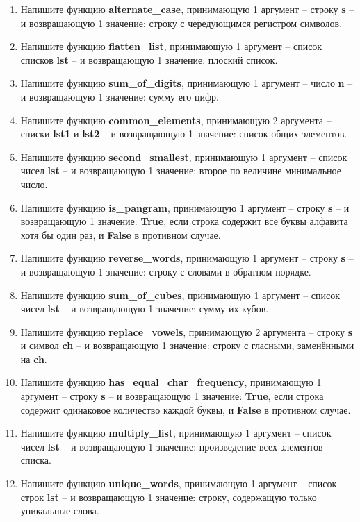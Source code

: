 \documentclass[a4,12pt]{article}
\theoremstyle{remark}
\begin{document}
\begin{enumerate}
    \item Напишите функцию \textbf{alternate\_case}, принимающую 1 аргумент – строку \textbf{s} – и возвращающую 1 значение: строку с чередующимся регистром символов.
    \item Напишите функцию \textbf{flatten\_list}, принимающую 1 аргумент – список списков \textbf{lst} – и возвращающую 1 значение: плоский список.
    \item Напишите функцию \textbf{sum\_of\_digits}, принимающую 1 аргумент – число \textbf{n} – и возвращающую 1 значение: сумму его цифр.
    \item Напишите функцию \textbf{common\_elements}, принимающую 2 аргумента – списки \textbf{lst1} и \textbf{lst2} – и возвращающую 1 значение: список общих элементов.
    \item Напишите функцию \textbf{second\_smallest}, принимающую 1 аргумент – список чисел \textbf{lst} – и возвращающую 1 значение: второе по величине минимальное число.
    \item Напишите функцию \textbf{is\_pangram}, принимающую 1 аргумент – строку \textbf{s} – и возвращающую 1 значение: \textbf{True}, если строка содержит все буквы алфавита хотя бы один раз, и \textbf{False} в противном случае.
    \item Напишите функцию \textbf{reverse\_words}, принимающую 1 аргумент – строку \textbf{s} – и возвращающую 1 значение: строку с словами в обратном порядке.
    \item Напишите функцию \textbf{sum\_of\_cubes}, принимающую 1 аргумент – список чисел \textbf{lst} – и возвращающую 1 значение: сумму их кубов.
    \item Напишите функцию \textbf{replace\_vowels}, принимающую 2 аргумента – строку \textbf{s} и символ \textbf{ch} – и возвращающую 1 значение: строку с гласными, заменёнными на \textbf{ch}.
    \item Напишите функцию \textbf{has\_equal\_char\_frequency}, принимающую 1 аргумент – строку \textbf{s} – и возвращающую 1 значение: \textbf{True}, если строка содержит одинаковое количество каждой буквы, и \textbf{False} в противном случае.
    \item Напишите функцию \textbf{multiply\_list}, принимающую 1 аргумент – список чисел \textbf{lst} – и возвращающую 1 значение: произведение всех элементов списка.
    \item Напишите функцию \textbf{unique\_words}, принимающую 1 аргумент – список строк \textbf{lst} – и возвращающую 1 значение: строку, содержащую только уникальные слова.

\end{enumerate}
\end{document}
